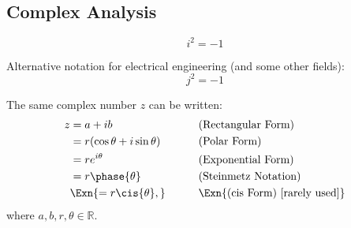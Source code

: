 \subsection{Complex Analysis}%
\label{sub:complex-analysis}

\begin{multicols}{2}

    \begin{CheatsheetEntryFrame}

        \begin{equation*}
            i^2 = -1
        \end{equation*}

        Alternative notation for electrical engineering (and some other fields):
        \begin{equation*}
            j^2 = -1
        \end{equation*}


        The same complex number $z$ can be written:
        \begin{alignat*}{2}
            z
                &= a + ib &
                    \qquad & \text{(Rectangular Form)} \\
                &= r(\cos{\theta} + i \sin{\theta}) &
                    \qquad & \text{(Polar Form)} \\
                &= r e^{i \theta} &
                    \qquad & \text{(Exponential Form)} \\
                &= r \phase{\theta} &
                    \qquad & \text{(Steinmetz Notation)} \\
                &\Exn{= r \cis{\theta},} &
                    \qquad & \Exn{\text{(cis Form) [rarely used]}}
        \end{alignat*}%
        where $a, b, r, \theta \in \mathbb{R}$.


\end{CheatsheetEntryFrame}
\end{multicols}
